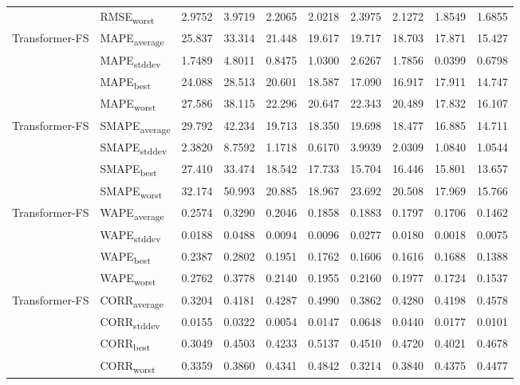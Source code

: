 {\begin{longtable}{l l c c c c c c c c}
 & RMSE\textsubscript{worst} & 2.9752 & 3.9719 & 2.2065 & 2.0218 & 2.3975 & 2.1272 & 1.8549 & 1.6855 \\
\cmidrule(lr){2-10}
\multirow{4}{*}{Transformer-FS} & MAPE\textsubscript{average} & 25.837 & 33.314 & 21.448 & 19.617 & 19.717 & 18.703 & 17.871 & 15.427 \\
 & MAPE\textsubscript{stddev} & 1.7489 & 4.8011 & 0.8475 & 1.0300 & 2.6267 & 1.7856 & 0.0399 & 0.6798 \\
 & MAPE\textsubscript{best} & 24.088 & 28.513 & 20.601 & 18.587 & 17.090 & 16.917 & 17.911 & 14.747 \\
 & MAPE\textsubscript{worst} & 27.586 & 38.115 & 22.296 & 20.647 & 22.343 & 20.489 & 17.832 & 16.107 \\
\cmidrule(lr){2-10}
\multirow{4}{*}{Transformer-FS} & SMAPE\textsubscript{average} & 29.792 & 42.234 & 19.713 & 18.350 & 19.698 & 18.477 & 16.885 & 14.711 \\
 & SMAPE\textsubscript{stddev} & 2.3820 & 8.7592 & 1.1718 & 0.6170 & 3.9939 & 2.0309 & 1.0840 & 1.0544 \\
 & SMAPE\textsubscript{best} & 27.410 & 33.474 & 18.542 & 17.733 & 15.704 & 16.446 & 15.801 & 13.657 \\
 & SMAPE\textsubscript{worst} & 32.174 & 50.993 & 20.885 & 18.967 & 23.692 & 20.508 & 17.969 & 15.766 \\
\cmidrule(lr){2-10}
\multirow{4}{*}{Transformer-FS} & WAPE\textsubscript{average} & 0.2574 & 0.3290 & 0.2046 & 0.1858 & 0.1883 & 0.1797 & 0.1706 & 0.1462 \\
 & WAPE\textsubscript{stddev} & 0.0188 & 0.0488 & 0.0094 & 0.0096 & 0.0277 & 0.0180 & 0.0018 & 0.0075 \\
 & WAPE\textsubscript{best} & 0.2387 & 0.2802 & 0.1951 & 0.1762 & 0.1606 & 0.1616 & 0.1688 & 0.1388 \\
 & WAPE\textsubscript{worst} & 0.2762 & 0.3778 & 0.2140 & 0.1955 & 0.2160 & 0.1977 & 0.1724 & 0.1537 \\
\cmidrule(lr){2-10}
\multirow{4}{*}{Transformer-FS} & CORR\textsubscript{average} & 0.3204 & 0.4181 & 0.4287 & 0.4990 & 0.3862 & 0.4280 & 0.4198 & 0.4578 \\
 & CORR\textsubscript{stddev} & 0.0155 & 0.0322 & 0.0054 & 0.0147 & 0.0648 & 0.0440 & 0.0177 & 0.0101 \\
 & CORR\textsubscript{best} & 0.3049 & 0.4503 & 0.4233 & 0.5137 & 0.4510 & 0.4720 & 0.4021 & 0.4678 \\
 & CORR\textsubscript{worst} & 0.3359 & 0.3860 & 0.4341 & 0.4842 & 0.3214 & 0.3840 & 0.4375 & 0.4477 \\

\end{longtable}}
